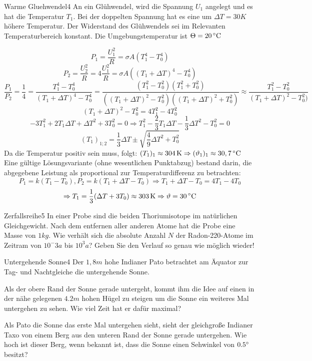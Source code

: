 



\begin{problem}{Warme Gluehwendel}{4}
An ein Glühwendel, wird die Spannung $U_1$ angelegt und es hat die Temperatur $T_1$. Bei der doppelten Spannung hat es eine um $\Delta T=30\unit{K}$ höhere Temperatur. Der Widerstand des Glühwendels sei im Relevanten Temperaturbereich konstant. Die Umgebungstemperatur ist $\Theta=20\,\mathrm{^\circ C}$
\begin{solution}
$$P_1=\frac{U_1^2}R=\sigma A (T_1^4 - T_0^4)$$
$$P_2=\frac{U_2^2}R=4\frac{U_1^2}R=\sigma A ((T_1+\Delta T)^4-T_0^4)$$
$$\frac{P_1}{P_2}=\frac 14=\frac{T_1^4-T_0^4}{(T_1+\Delta T)^4-T_0^4}=\frac{(T_1^2-T_0^2)(T_1^2+T_0^2)}{((T_1+\Delta T)^2-T_0^2)((T_1+\Delta T)^2+T_0^2)}\approx\frac{T_1^2-T_0^2}{(T_1+\Delta T)^2-T_0^2)}$$
$$(T_1+\Delta T)^2-T_0^2=4T_1^2-4T_0^2$$
$$-3T_1^2+2T_1\Delta T+\Delta T^2+3T_0^2=0 \Rightarrow T_1^2-\frac 23 T_1\Delta T-\frac 13 \Delta T^2-T_0^2=0$$
$$(T_1)_{1;2}=\frac 13\Delta T\pm\sqrt{\frac 49\Delta T^2+T_0^2}$$
Da die Temperatur positiv sein muss, folgt: $(T_1)_1\approx 304\,\mathrm{K} \Rightarrow (\vartheta_1)_1 \approx 30,7\,\mathrm{^\circ C}$
Eine gültige Lösungsvariante (ohne wesentlichen Punktabzug) bestand darin, die abgegebene Leistung als proportional zur Temperaturdifferenz zu betrachten:
$$P_1=k(T_1-T_0), P_2=k(T_1+\Delta T-T_0) \Rightarrow T_1+\Delta T-T_0=4T_1-4T_0$$
$$\Rightarrow T_1=\frac 13(\Delta T+3T_0)\approx 303\,\mathrm{K}\Rightarrow \vartheta=30\,\mathrm{^\circ C}$$
\end{solution}
\end{problem}

\begin{problem}{Zerfallsreihe}{5}
In einer Probe sind die beiden Thoriumisotope im natürlichen Gleichgewicht. Nach dem entfernen aller anderen Atome hat die Probe eine Masse von $1 \unit{kg}$. Wie verhält sich die absolute Anzahl $N$ der Radon-220-Atome im Zeitram von $10^-3\unit{a}$ bis $10^3\unit{a}$? Geben Sie den Verlauf so genau wie möglich wieder!
\end{problem}

\begin{problem}{Untergehende Sonne}{4}
Der $1,8\unit{m}$ hohe Indianer Pato betrachtet am Äquator zur Tag- und Nachtgleiche die untergehende Sonne.
 \begin{abcenum}
  \item Als der obere Rand der Sonne gerade untergeht, kommt ihm die Idee auf einen in der nähe gelegenen $4.2 \unit{m}$ hohen Hügel zu steigen um die Sonne ein weiteres Mal untergehen zu sehen. Wie viel Zeit hat er dafür maximal?
  \item Als Pato die Sonne das erste Mal untergehen sieht, sieht der gleichgroße Indianer Taxo von einem Berg aus den unteren Rand der Sonne gerade untergehen. Wie hoch ist dieser Berg, wenn bekannt ist, dass die Sonne einen Sehwinkel von $0.5 ^\circ$ besitzt?
 \end{abcenum}
\end{problem}

